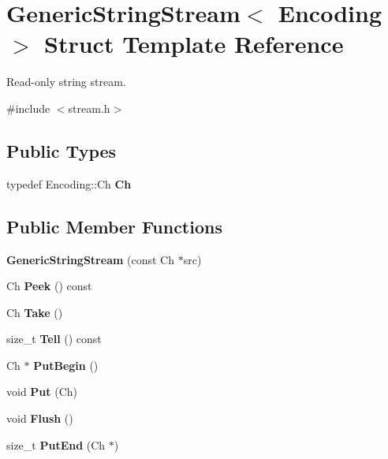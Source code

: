 \hypertarget{a00129}{}\section{Generic\+String\+Stream$<$ Encoding $>$ Struct Template Reference}
\label{a00129}


Read-\/only string stream.  




{\ttfamily \#include $<$stream.\+h$>$}

\subsection*{Public Types}
\begin{DoxyCompactItemize}
\item 
typedef Encoding\+::\+Ch {\bfseries Ch}\hypertarget{a00129_a4289aca895330084ff3168e37e4f08bd}{}\label{a00129_a4289aca895330084ff3168e37e4f08bd}

\end{DoxyCompactItemize}
\subsection*{Public Member Functions}
\begin{DoxyCompactItemize}
\item 
{\bfseries Generic\+String\+Stream} (const Ch $\ast$src)\hypertarget{a00129_a6b20885ed64e33f5d081a1e83b07da06}{}\label{a00129_a6b20885ed64e33f5d081a1e83b07da06}

\item 
Ch {\bfseries Peek} () const \hypertarget{a00129_a87d794a70cf132f32521fb2b145ba58d}{}\label{a00129_a87d794a70cf132f32521fb2b145ba58d}

\item 
Ch {\bfseries Take} ()\hypertarget{a00129_a0d26e3e77e4fca64a87c2d71f48ac5e5}{}\label{a00129_a0d26e3e77e4fca64a87c2d71f48ac5e5}

\item 
size\+\_\+t {\bfseries Tell} () const \hypertarget{a00129_a71dde3ded678912be1ef56376a72a653}{}\label{a00129_a71dde3ded678912be1ef56376a72a653}

\item 
Ch $\ast$ {\bfseries Put\+Begin} ()\hypertarget{a00129_a88c908b4dac9773240ce4bca4b6dd837}{}\label{a00129_a88c908b4dac9773240ce4bca4b6dd837}

\item 
void {\bfseries Put} (Ch)\hypertarget{a00129_aaa59dc5313151a4125bf7840f87a33eb}{}\label{a00129_aaa59dc5313151a4125bf7840f87a33eb}

\item 
void {\bfseries Flush} ()\hypertarget{a00129_a5ff1a870d9334cd054cf4ca34c86ddc3}{}\label{a00129_a5ff1a870d9334cd054cf4ca34c86ddc3}

\item 
size\+\_\+t {\bfseries Put\+End} (Ch $\ast$)\hypertarget{a00129_a07b942bacda494afb3b2f7629cef14af}{}\label{a00129_a07b942bacda494afb3b2f7629cef14af}

\end{DoxyCompactItemize}
